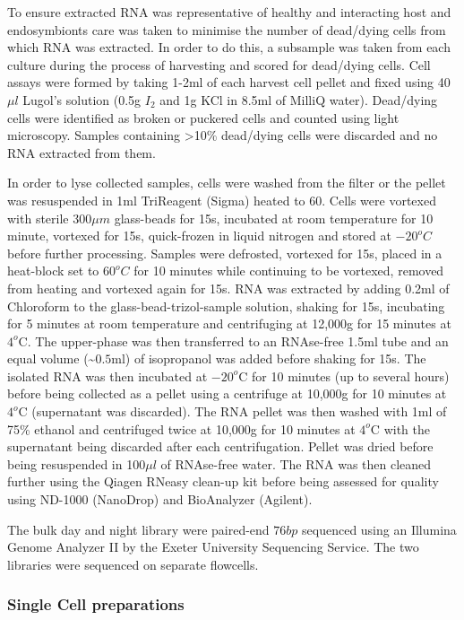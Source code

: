 To ensure extracted RNA was representative of healthy and interacting host 
and endosymbionts care was taken to minimise the number of dead/dying cells 
from which RNA was extracted.  In order to do this, a subsample was taken 
from each culture during the process of harvesting and scored for dead/dying cells.  
Cell assays were formed by taking 1-2ml of each harvest cell pellet and 
fixed using 40\(\mu l\) Lugol's solution (0.5g \(I_{2}\) and 1g KCl in 8.5ml 
of MilliQ water). Dead/dying cells were identified as broken or puckered cells 
and counted using light microscopy.  Samples containing >10\% dead/dying cells 
were discarded and no RNA extracted from them.

In order to lyse collected samples, cells were washed from the filter or the 
pellet was resuspended in 1ml TriReagent (Sigma) heated to \(60\)\celsius. 
Cells were vortexed with sterile \(300\mu m\) glass-beads for 15s, incubated at 
room temperature for 10 minute, vortexed for 15s, quick-frozen in liquid 
nitrogen and stored at \(-20^{o}C\) before further processing.  
Samples were defrosted, vortexed for 15s, placed in a heat-block set 
to \(60^{o}C\) for 10 minutes while continuing to be vortexed, removed from 
heating and vortexed again for 15s.  
RNA was extracted by adding 0.2ml of Chloroform to the glass-bead-trizol-sample 
solution, shaking for 15s, incubating for 5 minutes at room temperature and 
centrifuging at 12,000g for 15 minutes at $4^{o}$C.  
The upper-phase was then transferred to an RNAse-free 1.5ml tube and an 
equal volume (\textasciitilde$0.5$ml) of isopropanol was added before shaking for 15s.  
The isolated RNA was then incubated at $-20^{o}$C for 10 minutes 
(up to several hours) before being collected as a pellet using a centrifuge at 
10,000g for 10 minutes at $4^{o}$C (supernatant was discarded). 
The RNA pellet was then washed with 1ml of 75\% ethanol and centrifuged 
twice at 10,000g for 10 minutes at $4^{o}$C with the supernatant being 
discarded after each centrifugation.  
Pellet was dried before being resuspended in 100$\mu l$ of RNAse-free water.  
The RNA was then cleaned further using the Qiagen RNeasy clean-up kit 
before being assessed for quality using ND-1000 (NanoDrop) and BioAnalyzer (Agilent).

The bulk day and night library were paired-end \(76bp\) sequenced using an Illumina Genome
Analyzer II by the Exeter University Sequencing Service.  The two libraries were sequenced
on separate flowcells.

\subsubsection{Single Cell preparations}

